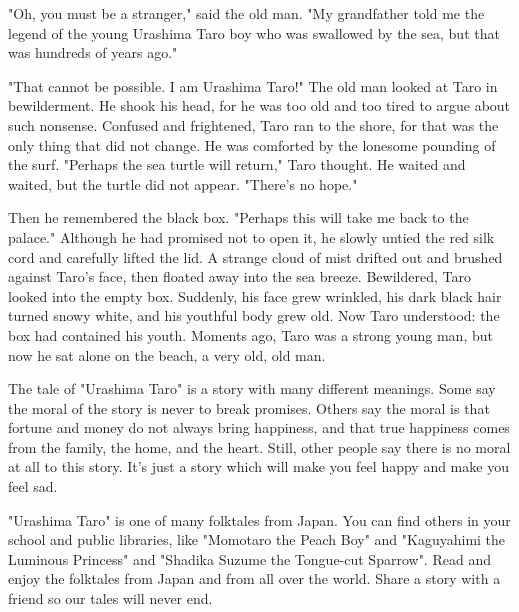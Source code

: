 "Oh, you must be a stranger," said the old man. "My grandfather told me the legend of the young Urashima Taro boy who was swallowed by the sea, but that was hundreds of years ago."

"That cannot be possible. I am Urashima Taro!" The old man looked at Taro in bewilderment. He shook his head, for he was too old and too tired to argue about such nonsense. Confused and frightened, Taro ran to the shore, for that was the only thing that did not change. He was comforted by the lonesome pounding of the surf. "Perhaps the sea turtle will return," Taro thought. He waited and waited, but the turtle did not appear. "There's no hope."

Then he remembered the black box. "Perhaps this will take me back to the palace." Although he had promised not to open it, he slowly untied the red silk cord and carefully lifted the lid. A strange cloud of mist drifted out and brushed against Taro's face, then floated away into the sea breeze. Bewildered, Taro looked into the empty box. Suddenly, his face grew wrinkled, his dark black hair turned snowy white, and his youthful body grew old. Now Taro understood: the box had contained his youth. Moments ago, Taro was a strong young man, but now he sat alone on the beach, a very old, old man.

The tale of "Urashima Taro" is a story with many different meanings. Some say the moral of the story is never to break promises. Others say the moral is that fortune and money do not always bring happiness, and that true happiness comes from the family, the home, and the heart. Still, other people say there is no moral at all to this story. It's just a story which will make you feel happy and make you feel sad.

"Urashima Taro" is one of many folktales from Japan. You can find others in your school and public libraries, like "Momotaro the Peach Boy" and "Kaguyahimi the Luminous Princess" and "Shadika Suzume the Tongue-cut Sparrow". Read and enjoy the folktales from Japan and from all over the world. Share a story with a friend so our tales will never end.
